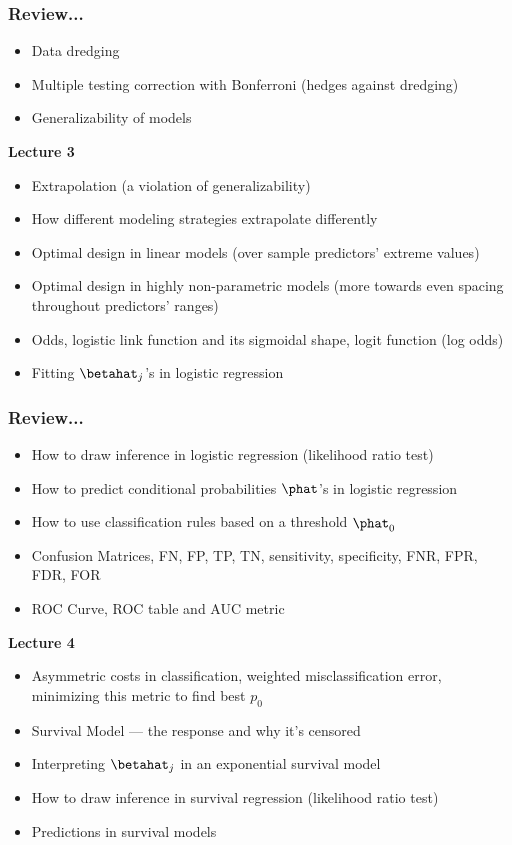 \documentclass[handout]{beamer}
\begin{document}
\begin{frame}\frametitle{Review...}

\begin{itemize}
\item Data dredging
\item Multiple testing correction with Bonferroni (hedges against dredging)
\item Generalizability of models
\end{itemize}
	
\textbf{Lecture 3}

\begin{itemize}
\item Extrapolation (a violation of generalizability)
\item How different modeling strategies extrapolate differently
\item Optimal design in linear models (over sample predictors' extreme values)
\item Optimal design in highly non-parametric models (more towards even spacing throughout predictors' ranges)
\item Odds, logistic link function and its sigmoidal shape, logit function (log odds)
\item Fitting $\betahat_j$'s in logistic regression
\end{itemize}

\end{frame}

\begin{frame}\frametitle{Review...}
\begin{itemize}
\item How to draw inference in logistic regression (likelihood ratio test)
\item How to predict conditional probabilities $\phat$'s in logistic regression
\item How to use classification rules based on a threshold $\phat_0$
\item Confusion Matrices, FN, FP, TP, TN, sensitivity, specificity, FNR, FPR, FDR, FOR
\item ROC Curve, ROC table and AUC metric
\end{itemize}
	
\textbf{Lecture 4}

\begin{itemize}
\item Asymmetric costs in classification, weighted misclassification error, minimizing this metric to find best $p_0$
\item Survival Model --- the response and why it's censored
\item Interpreting $\betahat_j$ in an exponential survival model
\item How to draw inference in survival regression (likelihood ratio test)
\item Predictions in survival models

\end{itemize}
\end{frame}
\end{document}
